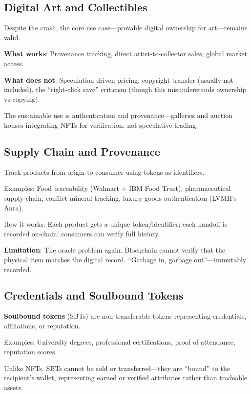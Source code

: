 \documentclass[11pt,a4paper]{article}
\newcommand{\keyword}[1]{\textbf{\textcolor{AccentOrange}{#1}}}
\begin{document}
\subsection{Digital Art and Collectibles}

Despite the crash, the core use case---provable digital ownership for art---remains valid.

\textbf{What works}: Provenance tracking, direct artist-to-collector sales, global market access.

\textbf{What does not}: Speculation-driven pricing, copyright transfer (usually not included), the ``right-click save'' criticism (though this misunderstands ownership vs copying).

The sustainable use is authentication and provenance---galleries and auction houses integrating NFTs for verification, not speculative trading.

\subsection{Supply Chain and Provenance}

Track products from origin to consumer using tokens as identifiers.

Examples: Food traceability (Walmart + IBM Food Trust), pharmaceutical supply chain, conflict mineral tracking, luxury goods authentication (LVMH's Aura).

How it works: Each product gets a unique token/identifier; each handoff is recorded on-chain; consumers can verify full history.

\textbf{Limitation}: The oracle problem again. Blockchain cannot verify that the physical item matches the digital record. ``Garbage in, garbage out''---immutably recorded.

\subsection{Credentials and Soulbound Tokens}

\keyword{Soulbound tokens} (SBTs) are non-transferable tokens representing credentials, affiliations, or reputation.

Examples: University degrees, professional certifications, proof of attendance, reputation scores.

Unlike NFTs, SBTs cannot be sold or transferred---they are ``bound'' to the recipient's wallet, representing earned or verified attributes rather than tradeable assets.
\end{document}
